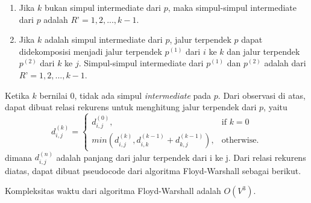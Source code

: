     \begin{enumerate}
        \item Jika $k$ bukan simpul intermediate dari $p$, maka simpul-simpul intermediate dari $p$ adalah $R’ = {1, 2, ..., k-1}$.
        \item Jika $k$ adalah simpul intermediate dari $p$, jalur terpendek $p$ dapat didekomposisi menjadi jalur terpendek $p^{(1)}$ dari $i$ ke $k$ 
        dan jalur terpendek $p^{(2)}$ dari $k$ ke $j$. Simpul-simpul intermediate dari $p^{(1)}$ dan $p^{(2)}$ adalah dari $R’ = {1, 2, ..., k-1}$.
    \end{enumerate}

    Ketika $k$ bernilai 0, tidak ada simpul \textit{intermediate} pada $p$. Dari observasi di atas, dapat dibuat relasi rekurens untuk menghitung jalur terpendek dari $p$, yaitu
    \begin{equation}
        d_{i,j}^{(k)} =
        \begin{cases}
            d_{i,j}^{(0)}, & \text{if } k = 0\\
            min(d_{i,j}^{(k)}, d_{i,k}^{(k-1)} + d_{k,j}^{(k-1)}), & \text{otherwise}.
        \end{cases}
    \end{equation}
    dimana $d_{i,j}^{(n)}$ adalah panjang dari jalur terpendek dari i ke j. Dari relasi rekurens diatas, dapat dibuat pseudocode dari algoritma Floyd-Warshall sebagai berikut.

    \medskip
    

    Kompleksitas waktu dari algoritma Floyd-Warshall adalah $O(V^{3})$.
